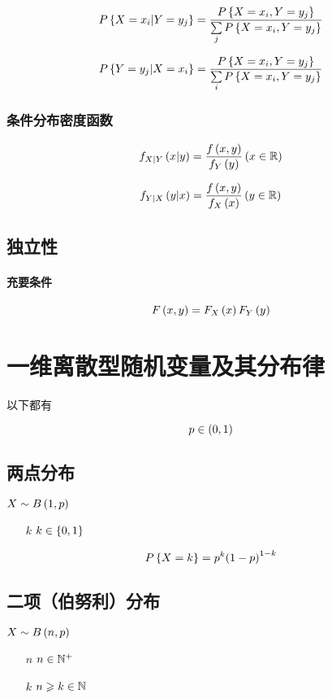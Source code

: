 \documentclass{article}
\begin{document}
\[P\left\{X=x_i|Y=y_j\right\}=\frac{P\left\{X=x_i,Y=y_j\right\}}{\sum\limits_jP\left\{X=x_i,Y=y_j\right\}}\]

\[P\left\{Y=y_j|X=x_i\right\}=\frac{P\left\{X=x_i,Y=y_j\right\}}{\sum\limits_iP\left\{X=x_i,Y=y_j\right\}}\]

\subsubsection{条件分布密度函数}

\[f_{X|Y}\left(x|y\right)=\frac{f\left(x,y\right)}{f_Y\left(y\right)}\left(x\in\mathbb R\right)\]

\[f_{Y|X}\left(y|x\right)=\frac{f\left(x,y\right)}{f_X\left(x\right)}\left(y\in\mathbb R\right)\]

\subsection{独立性}

\paragraph{充要条件}

\[F\left(x,y\right)=F_X\left(x\right)F_Y\left(y\right)\]

\section{一维离散型随机变量及其分布律}

以下都有

\[p\in\left(0,1\right)\]

\subsection{两点分布}

$X\sim B\left(1,p\right)$

\begin{enumerate}
    \item [$k$] $k\in\left\{0,1\right\}$
\end{enumerate}

\[P\left\{X=k\right\}=p^k{\left(1-p\right)}^{1-k}\]

\subsection{二项（伯努利）分布}

$X\sim B\left(n,p\right)$

\begin{enumerate}
    \item [$n$] $n\in\mathbb N^+$
    \item [$k$] $n\geqslant k\in\mathbb N$
\end{enumerate}
\end{document}
